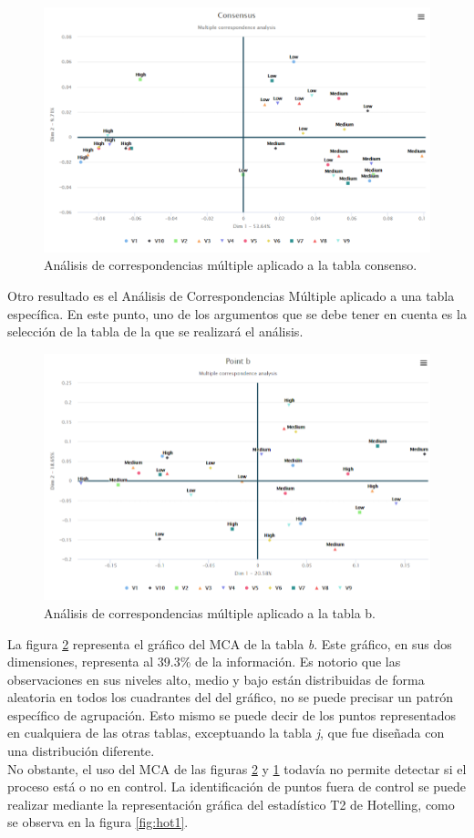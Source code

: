 \documentclass[water,article,submit,moreauthors,pdftex]{mdpi}
\begin{document}
\begin{figure}[!ht]



\begin{center}\includegraphics[width=0.6\linewidth,]{CONS1} \end{center}

\caption{Análisis de correspondencias múltiple aplicado a la tabla consenso.}

\label{fig:CONS1}
\end{figure}

Otro resultado es el Análisis de Correspondencias Múltiple aplicado a
una tabla específica. En este punto, uno de los argumentos que se debe
tener en cuenta es la selección de la tabla de la que se realizará el
análisis.

\begin{figure}[!ht]



\begin{center}\includegraphics[width=0.6\linewidth,]{MCAb} \end{center}

\caption{Análisis de correspondencias múltiple aplicado a la tabla b.}

\label{fig:MCAb}
\end{figure}

La figura \ref{fig:MCAb} representa el gráfico del MCA de la tabla
\emph{b}. Este gráfico, en sus dos dimensiones, representa al 39.3\% de
la información. Es notorio que las observaciones en sus niveles alto,
medio y bajo están distribuidas de forma aleatoria en todos los
cuadrantes del del gráfico, no se puede precisar un patrón específico de
agrupación. Esto mismo se puede decir de los puntos representados en
cualquiera de las otras tablas, exceptuando la tabla \emph{j}, que fue
diseñada con una distribución diferente.\\
No obstante, el uso del MCA de las figuras \ref{fig:MCAb} y
\ref{fig:CONS1} todavía no permite detectar si el proceso está o no en
control. La identificación de puntos fuera de control se puede realizar
mediante la representación gráfica del estadístico T2 de Hotelling, como
se observa en la figura \ref{fig:hot1}.
\end{document}
